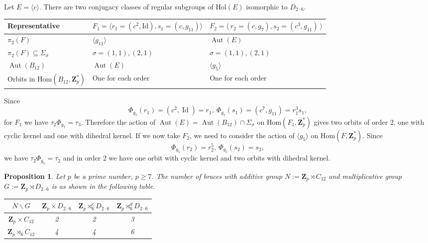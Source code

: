\documentclass[12pt]{article}
\newtheorem{proposition}[theorem]{Proposition}
\theoremstyle{definition}
\newcommand{\Z}{\mathbf Z}
\newcommand{\Hol}{\mathrm{Hol}}
\newcommand{\Hom}{\mathrm{Hom}}
\newcommand{\Aut}{\operatorname{Aut}}
\newcommand{\Id}{\operatorname{Id}}
\begin{document}
Let $E=\langle c\rangle$. There are two conjugacy classes of regular subgroups of $\Hol(E)$ isomorphic to $D_{2\cdot6}$. 

\begin{center}
    \begin{tabular}{|l|l|l|}
    \hline
      Representative& $F_1=\langle  r_1=(c^2,\mathrm{Id}),s_1=(c,g_{11}) \rangle$ & $F_2=\langle\  r_2=(c,g_7),s_2=(c^3,g_{11}) \ \rangle$ \\           \hline
      $\pi_2(F)$ & $\langle g_{11} \rangle $ &$\Aut(E)$\\
      $\pi_2(F)\subseteq \Sigma_{\sigma}$ &  $\sigma=(1,1),(2,1)$ &
      $\sigma=(1,1),(2,1)$ \\
      $\Aut(B_{12})$ &$\Aut(E)$ & $\langle g_5\rangle$ \\
      Orbits in $\Hom(B_{12},\Z_p^*)$ & One for each order & One for each order \\
      \hline
    \end{tabular}
\end{center}    

Since 
$$\Phi_{g_7}(r_1)=(c^2,\Id)=r_1,\   \Phi_{g_7}(s_1)=(c^7,g_{11})=r_1^3s_1,$$
for $F_1$ we have $\tau_2\Phi_{g_7}=\tau_3$. Therefore the action of 
$\Aut(E)=\Aut(B_{12})\cap \Sigma_{\sigma}$ on $\Hom(F_1,\Z_p^
*)$ gives two orbits of order $2$, one with cyclic kernel and  one with dihedral kernel. If we now take $F_2$, we need to consider the action of $\langle g_5\rangle$ on $\Hom(F,\Z_p^*)$. Since
$$\Phi_{g_5}(r_2)=r_2^5,\   \Phi_{g_5}(s_2)=s_2,$$
we have $\tau_2\Phi_{g_5}=\tau_2$ and in order 2 we have one orbit with cyclic kernel and two orbits with dihedral kernel.

\begin{proposition}
	Let $p$ be a prime number, $p\geq 7$.
	The number of braces with additive group $N:=\Z_p \rtimes C_{12}$ and multiplicative group $G:=\Z_p\rtimes D_{2\cdot 6}$ is as shown in the following table.
	
	\begin{center}
		\begin{tabular}{|c||c|c|c|}
			\hline
			$N \backslash G$ & $\Z_p\times D_{2\cdot 6}$ & $\Z_p\rtimes_6^c D_{2\cdot 6} $ & $\Z_p\rtimes_6^d D_{2\cdot 6}$ \\
			\hline
			\hline
			$\Z_p\times C_{12}$ & 2 & 2 & 3 \\
			\hline
			$\Z_p\rtimes_6 C_{12} $ & 4 & 4 & 6 \\
			\hline
		\end{tabular}
	\end{center}
\end{proposition}
\end{document}
